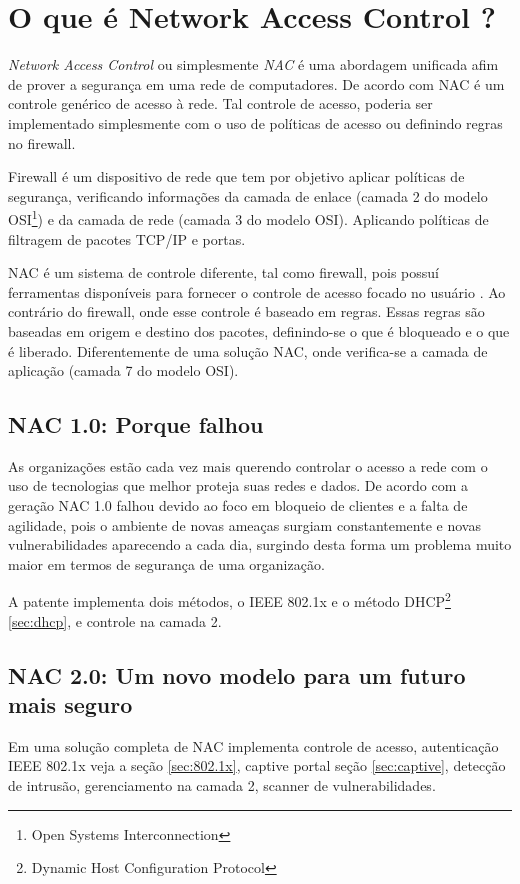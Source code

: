 \documentclass[12pt, brazil, ruledheader, pnumromarab,normaltoc]{abnt}
\begin{document}
\section{O que é Network Access Control ?}\label{sec:nac}
\emph{Network Access Control} ou simplesmente \emph{NAC} é uma abordagem unificada afim de prover a segurança em uma rede de computadores. De acordo com \cite{interop-nac} NAC é um controle genérico de acesso à rede. Tal controle de acesso, poderia ser implementado simplesmente com o uso de políticas de acesso ou definindo regras no firewall.
\par
Firewall é um dispositivo de rede que tem por objetivo aplicar políticas de segurança, verificando informações da camada de enlace (camada 2 do modelo OSI\footnote{Open Systems Interconnection}) e da camada de rede (camada 3 do modelo OSI). Aplicando políticas de filtragem  de pacotes TCP/IP  e portas.
\par
NAC é um sistema de controle diferente, tal como firewall, pois possuí ferramentas disponíveis para fornecer o controle de acesso focado no usuário \cite{interop-nac}. Ao contrário do firewall, onde esse controle é baseado em regras. Essas regras são baseadas em origem e destino dos pacotes, definindo-se o que é bloqueado e o que é liberado. Diferentemente de uma solução NAC, onde verifica-se a camada de aplicação (camada 7 do modelo OSI).

\subsection{NAC 1.0: Porque falhou}
As organizações estão cada vez mais querendo controlar o acesso a rede com o uso de tecnologias que melhor proteja suas redes e dados.
De acordo com \cite{mfrizzi} a geração NAC 1.0 falhou devido ao foco em bloqueio de clientes e a falta de agilidade, pois o ambiente de novas ameaças surgiam constantemente e novas vulnerabilidades aparecendo a cada dia, surgindo desta forma um problema muito maior em termos de segurança de uma organização.
\par
A patente \cite{nac} implementa dois métodos, o IEEE 802.1x \cite{802.1x} e o método DHCP\footnote{Dynamic Host Configuration Protocol} \ref{sec:dhcp}, e controle na camada 2.

\subsection{NAC 2.0: Um novo modelo para um futuro mais seguro}
Em uma solução completa de NAC \cite{nac} implementa controle de acesso, autenticação IEEE 802.1x veja a seção \ref{sec:802.1x}, captive portal seção \ref{sec:captive}, detecção de intrusão, gerenciamento na camada 2, scanner de vulnerabilidades. 
\end{document}
